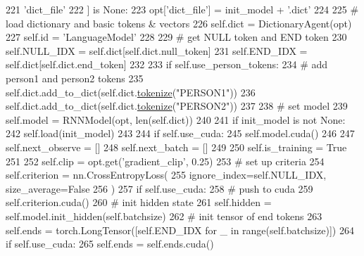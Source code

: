 \begin{DoxyCode}
221                 \textcolor{stringliteral}{'dict\_file'}
222             ] \textcolor{keywordflow}{is} \textcolor{keywordtype}{None}:
223                 opt[\textcolor{stringliteral}{'dict\_file'}] = init\_model + \textcolor{stringliteral}{'.dict'}
224 
225             \textcolor{comment}{# load dictionary and basic tokens & vectors}
226             self.dict = DictionaryAgent(opt)
227             self.id = \textcolor{stringliteral}{'LanguageModel'}
228 
229             \textcolor{comment}{# get NULL token and END token}
230             self.NULL\_IDX = self.dict[self.dict.null\_token]
231             self.END\_IDX = self.dict[self.dict.end\_token]
232 
233             \textcolor{keywordflow}{if} self.use\_person\_tokens:
234                 \textcolor{comment}{# add person1 and person2 tokens}
235                 self.dict.add\_to\_dict(self.dict.\hyperlink{namespaceparlai_1_1agents_1_1tfidf__retriever_1_1build__tfidf_a1fdb457e98eb4e4c26047e229686a616}{tokenize}(\textcolor{stringliteral}{"PERSON1"}))
236                 self.dict.add\_to\_dict(self.dict.\hyperlink{namespaceparlai_1_1agents_1_1tfidf__retriever_1_1build__tfidf_a1fdb457e98eb4e4c26047e229686a616}{tokenize}(\textcolor{stringliteral}{"PERSON2"}))
237 
238             \textcolor{comment}{# set model}
239             self.model = RNNModel(opt, len(self.dict))
240 
241             \textcolor{keywordflow}{if} init\_model \textcolor{keywordflow}{is} \textcolor{keywordflow}{not} \textcolor{keywordtype}{None}:
242                 self.load(init\_model)
243 
244             \textcolor{keywordflow}{if} self.use\_cuda:
245                 self.model.cuda()
246 
247         self.next\_observe = []
248         self.next\_batch = []
249 
250         self.is\_training = \textcolor{keyword}{True}
251 
252         self.clip = opt.get(\textcolor{stringliteral}{'gradient\_clip'}, 0.25)
253         \textcolor{comment}{# set up criteria}
254         self.criterion = nn.CrossEntropyLoss(
255             ignore\_index=self.NULL\_IDX, size\_average=\textcolor{keyword}{False}
256         )
257         \textcolor{keywordflow}{if} self.use\_cuda:
258             \textcolor{comment}{# push to cuda}
259             self.criterion.cuda()
260         \textcolor{comment}{# init hidden state}
261         self.hidden = self.model.init\_hidden(self.batchsize)
262         \textcolor{comment}{# init tensor of end tokens}
263         self.ends = torch.LongTensor([self.END\_IDX \textcolor{keywordflow}{for} \_ \textcolor{keywordflow}{in} range(self.batchsize)])
264         \textcolor{keywordflow}{if} self.use\_cuda:
265             self.ends = self.ends.cuda()

\end{DoxyCode}
